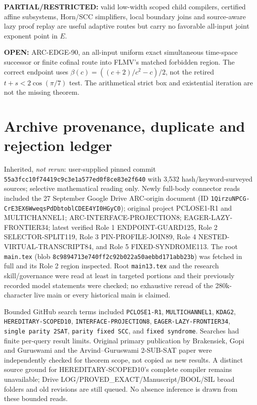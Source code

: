 \documentclass[11pt]{article}
\begin{document}
\par\noindent\textbf{PARTIAL/RESTRICTED:} valid low-width scoped child compilers, certified affine subsystems, Horn/SCC simplifiers, local boundary joins and source-aware lazy proof replay are useful adaptive routes but carry no favorable all-input joint exponent point in $E$.

\par\noindent\textbf{OPEN:} ARC-EDGE-90, an all-input uniform exact simultaneous time-space successor or finite cofinal route into FLMV's matched forbidden region. The correct endpoint uses $\beta(c)=((c+2)/c^2-c)/2$, not the retired $t+s<2\cos(\pi/7)$ test. The arithmetical strict box and existential iteration are not the missing theorem.

\section{Archive provenance, duplicate and rejection ledger}
Inherited, \emph{not rerun}: user-supplied pinned commit \texttt{55a3fcc10f74419c9c3e1a577ed0f8ce83e2f640} with 3,532 hash/keyword-surveyed sources; selective mathematical reading only. Newly full-body connector reads included the 27 September Google Drive ARC-origin document (ID \texttt{1QirzuNPCG-CrE3EX6WweqsPdDbtoblCDEE4YI0HGyC0}); original project PCLOSE1-R1 and MULTICHANNEL1; ARC-INTERFACE-PROJECTION8; EAGER-LAZY-FRONTIER34; latest verified Role 1 ENDPOINT-GUARD125, Role 2 SELECTOR-SPLIT119, Role 3 PIN-PROFILE-JOIN89, Role 4 NESTED-VIRTUAL-TRANSCRIPT84, and Role 5 FIXED-SYNDROME113. The root \texttt{main.tex} (blob \texttt{8c9894713e740ff2c92b022a50aebbd171abb23b}) was fetched in full and its Role 2 region inspected. Root \texttt{main13.tex} and the research skill/governance were read at least in targeted portions and their previously recorded model statements were checked; no exhaustive reread of the 280k-character live main or every historical main is claimed.

Bounded GitHub search terms included \texttt{PCLOSE1-R1}, \texttt{MULTICHANNEL1}, \texttt{KDAG2}, \texttt{HEREDITARY-SCOPED10}, \texttt{INTERFACE-PROJECTION8}, \texttt{EAGER-LAZY-FRONTIER34}, \texttt{single parity 2SAT}, \texttt{parity fixed SCC}, and \texttt{fixed syndrome}. Searches had finite per-query result limits. Original primary publication by Brakensiek, Gopi and Guruswami and the Arvind--Guruswami 2-SUB-SAT paper were independently checked for theorem scope, not copied as new results. A distinct source ground for HEREDITARY-SCOPED10's complete compiler remains unavailable; Drive LOG/PROVED\_EXACT/Manuscript/BOOL/SIL broad folders and old revisions are still queued. No absence inference is drawn from these bounded reads.
\end{document}
